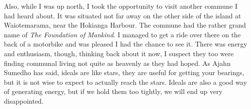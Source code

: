Also, while I was up north, I took the opportunity to visit another
commune I had heard about. It was situated not far away on the other
side of the island at Waiotemarama, near the Hokianga Harbour. The
commune had the rather grand name of \emph{The Foundation of Mankind}. I
managed to get a ride over there on the back of a motorbike and was
pleased I had the chance to see it. There was energy and enthusiasm,
though, thinking back about it now, I suspect they too were finding
communal living not quite as heavenly as they had hoped. As Ajahn
Sumedho has said, ideals are like stars, they are useful for getting
your bearings, but it is not wise to expect to actually reach the stars.
Ideals are also a good way of generating energy, but if we hold them too
tightly, we will end up very disappointed.

